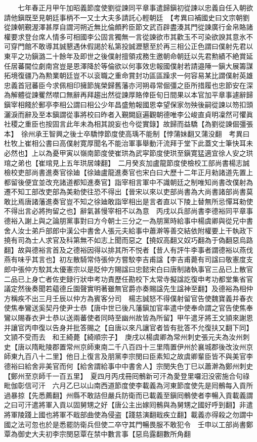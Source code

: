 　　七年春正月甲午加昭義節度使劉從諫同平章事遣歸鎭初從諫以忠義自任入朝欲請他鎭既至見朝廷事柄不一又士大夫多請託心輕朝廷　【考異曰補國史曰文宗朝劉從諫朝覲渥澤甚厚自謂河朔近無比倫頗矜臣節文武百辟盡湊其門從諫廣行金帛賂諸權要求登台席人情多可相國李公固言獨無一言從諫欲市其歡玉不可染欲諛其意氷不可穿門館不敢導其誠懇遇休假謁於私第投誠瀝懇至於再三相公正色謂曰僕射先君以東平之功鎭潞二十餘年及即世之後僕射擅領戎務生邀朝命朝廷以先君勲績不絶賞延任居蕃閫位劇南宫豈是恩澤降於等倫欲以何事效忠報國僕射若請邉陲一鎭大展籌謀拓境復疆乃為勲業朝廷豈不以衮職之重命賞封功區區躁求一何容易某比謂僕射英雄忠義首冠蕃臣今求佩相印擁節旄榮歸舊藩亦河朔尋常倔彊之臣所措履也忠節安在深為解體從諫矍然噤口無辭再拜趨出然從諫厚賂倖臣旬日間果以本官加平章事遽辭歸鎭宰相餞於郵亭李相公謂曰相公少年昌盛勉報國恩幸望保家勿殃後嗣從諫以笏扣頭灑淚而辭及至本鎭謂從事將校曰昨者入覲闕庭遍觀朝德唯李公峻直貞明凜然可懼眞社稷之重臣也按固言此年未為相其說妄也今從實錄】故歸而益驕【為劉從諫倔彊張本】　徐州承王智興之後士卒驕悖節度使高瑀不能制【悖蒲妹翻又蒲没翻　考異曰杜牧上崔相公書曰高僕射寛厚聞名不能治軍事舉動汗流拜于堂下此蓋文士筆快耳未必然也】上以為憂甲寅以嶺南節度使崔珙為武寜節度使珙至鎭寛猛適宜徐人安之珙琯之弟也【崔琯見上五年珙居竦翻】　二月癸亥加盧龍節度使檢校工部尚書楊志誠檢校吏部尚書進奏官徐廸【徐廸盧龍進奏官也宋白曰大歷十二年正月勑諸道先置上都留後便宜並改充諸道都知進奏官】詣宰相言軍中不識朝廷之制唯知尚書改僕射為遷不知工部改吏部為美勑使往恐不得出【晉宋以來以吏部尚書為大尚書諸部尚書莫敢比焉唐諸藩進奏官豈不知之徐廸敢詣宰相出是言者直以下陵上替無所忌憚耳勑使不得出言必將拘留之也】辭氣甚慢宰相不以為意　丙戌以兵部尚書李德裕同平章事德裕入謝上與之論朋黨事對曰方今朝士三分之一為朋黨時給事中楊虞卿與從兄中書舍人汝士弟戶部郎中漢公中書舍人張元夫給事中蕭澣等善交結依附權要上干執政下撓有司為士人求官及科第無不如志上聞而惡之【撓奴高翻又奴巧翻為于偽翻惡烏路翻】故與德裕言首及之德裕因得以排其所不悦者【昔人有評牛李事者謂德裕以燕伐燕有味乎其言也】初左散騎常侍張仲方嘗駮李吉甫諡【李吉甫薨有司諡曰敬憲度支郎中張仲方駮其太優憲宗以是貶仲方賜諡曰忠懿宋白曰唐制諸執事官三品已上散官二品已上身亡者佐吏録行狀申考功責歷任勘校下太常寺擬諡訖復申考功都堂集省官議定然後奏聞若藴德丘園聲實明著雖無官爵亦奏賜諡先生諡神至翻】及德裕為相仲方稱疾不出三月壬辰以仲方為賓客分司　楊志誠怒不得僕射留官告使魏寶義并春衣使焦奉鸞送奚契丹使尹士恭【唐中世已後凡藩鎭加官率遣中使奉命謂之官告使焦奉鸞以賜春衣尹士恭以送兩蕃使者同時至幽州故皆為所留】甲午遣牙將王文頴來謝恩并讓官丙申復以告身并批答賜之【自唐以來凡讓官者皆有批答不允復扶又翻下同】文頴不受而去　和王綺薨【綺順宗子】　庚戌以楊虞卿為常州刺史張元夫為汝州刺史【唐以隋毗陵郡置常州京師東南二千八百四十三里隋置伊州於襄城郡後改汝州京師東九百八十二里】他日上復言及朋黨李宗閔曰臣素知之故虞卿輩臣皆不與美官李德裕曰給舍非美官而何【給舍謂給事中中書舍人】宗閔失色丁巳以蕭澣為鄭州刺史【鄭州至京師千一百五里】　夏四月丙戌冊囘鶻新可汗為愛登里囉汨没密施合句祿毗伽彰信可汗　六月乙巳以山南西道節度使李載義為河東節度使先是囘鶻每入貢所過暴掠【先悉薦翻】州縣不敢詰但嚴兵防衛而已載義至鎭囘鶻使者李暢入貢載義謂之曰可汗遣將軍入貢以固舅甥之好【唐公主出嫁囘鶻與為舅甥之國好呼到翻】非遣將軍陵踐上國也將軍不戢部曲使為侵盗【踐慈演翻戢疾立翻】載義亦得殺之勿謂中國之法可忽也於是悉罷防衛兵但使二卒守其門暢畏服不敢犯令　壬申以工部尚書鄭覃為御史大夫初李宗閔惡覃在禁中數言事【惡烏露翻數所角翻